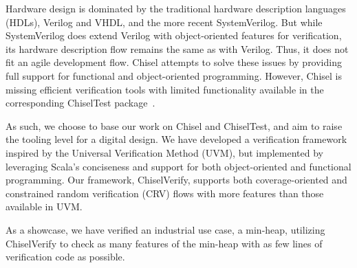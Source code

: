 \documentclass[conference]{IEEEtran}
\begin{document}
Hardware design is dominated by the traditional hardware description languages (HDLs), Verilog and VHDL, and %
the more recent SystemVerilog. But while SystemVerilog  %
does extend Verilog with object-oriented features for verification, its hardware %
description flow remains the same as with Verilog. Thus, it does not fit an agile %
development flow. %
Chisel attempts to solve these issues by providing full support for %
functional and object-oriented programming. However, Chisel is missing efficient verification tools %
with limited functionality available in the corresponding ChiselTest package~\cite{chisel:tester2}. %

As such, we choose to base our work on Chisel and ChiselTest, and aim to raise %
the tooling level for a digital design. We have developed a verification framework %
inspired by the Universal Verification Method (UVM), but implemented by leveraging %
Scala's conciseness and support for both object-oriented and functional programming. %
Our framework, ChiselVerify, supports both coverage-oriented and constrained %
random verification (CRV) flows with more features than those available in UVM. %

As a showcase, we have verified an industrial use case, a min-heap, utilizing 
ChiselVerify to check as many features of the min-heap with as few lines of 
verification code as possible.
\end{document}
